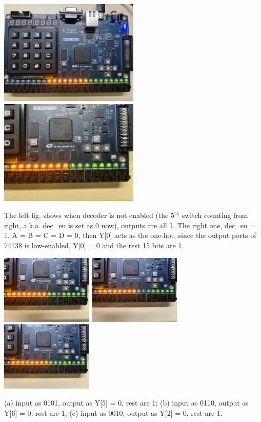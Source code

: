 \documentclass[onecolumn, oneside, ctexart]{SUSTechHomework}
\begin{document}
\centerline{\includegraphics[width=0.5\textwidth]{fig/e1}
		\quad\includegraphics[width=0.5\textwidth]{fig/e2}}
\par The left fig. shows when decoder is not enabled (the 5$^{\text{th}}$ switch counting from right, a.k.a. dec\_en is set as 0 now), outputs are all 1. The right one, dec\_en = 1, A = B = C = D = 0, then Y[0] acts as the one-hot, since the output ports of 74138 is low-enabled, Y[0] = 0 and the rest 15 bits are 1.\\

\centerline{\includegraphics[width=0.33\textwidth]{fig/e3}
		\quad\includegraphics[width=0.33\textwidth]{fig/e4}
		\quad\includegraphics[width=0.33\textwidth]{fig/e5}}
\scriptsize
\noindent (a) input as 0101, output as Y[5] = 0, rest are 1; \qquad (b) input as 0110, output as Y[6] = 0, rest are 1;
\qquad (c) input as 0010, output as Y[2] = 0, rest are 1.
\normalsize
\end{document}
